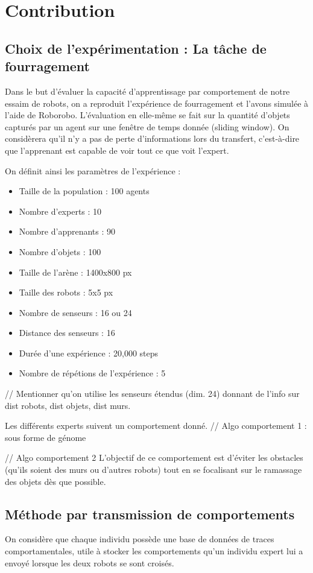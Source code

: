 \documentclass[a4paper, 12pt]{report}
\begin{document}
    \chapter{Contribution}
   
    \section{Choix de l'expérimentation : La tâche de fourragement}
    Dans le but d'évaluer la capacité d'apprentissage par comportement de notre essaim de robots, on a reproduit l'expérience de fourragement et l'avons simulée à l'aide de Roborobo.
    L'évaluation en elle-même se fait sur la quantité d'objets capturés par un agent sur une fenêtre de temps donnée (sliding window). On considèrera qu'il n'y a pas de perte d'informations lors du transfert, c'est-à-dire que l'apprenant est capable de voir tout ce que voit l'expert.
    
    On définit ainsi les paramètres de l'expérience :
    \begin{itemize}
    \item Taille de la population : 100 agents
    \item Nombre d'experts : 10
    \item Nombre d'apprenants : 90
    \item Nombre d'objets : 100
    \item Taille de l'arène : 1400x800 px
    \item Taille des robots : 5x5 px
    \item Nombre de senseurs : 16 ou 24
    \item Distance des senseurs : 16
    \item Durée d'une expérience : 20,000 steps
    \item Nombre de répétions de l'expérience : 5
    \end{itemize}
    
// Mentionner qu'on utilise les senseurs étendus (dim. 24) donnant de l'info sur dist robots, dist objets, dist murs.

Les différents experts suivent un comportement donné.
// Algo comportement 1 : sous forme de génome

// Algo comportement 2
L'objectif de ce comportement est d'éviter les obstacles (qu'ils soient des murs ou d'autres robots) tout en se focalisant sur le ramassage des objets dès que possible.


	\section{Méthode par transmission de comportements}
	On considère que chaque individu possède une base de données de traces comportamentales, utile à stocker les comportements qu'un individu expert lui a envoyé lorsque les deux robots se sont croisés.
	
\end{document}
